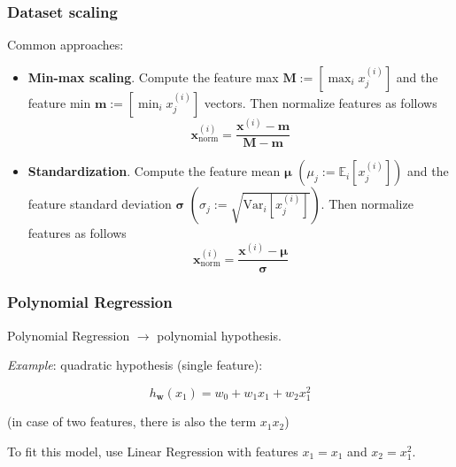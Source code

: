 \documentclass{beamer}
\begin{document}
	\begin{frame}
		\frametitle{Dataset scaling}
	
		Common approaches:
		\begin{itemize}
			\item \textbf{Min-max scaling}. Compute the feature max $\bm{M} := [\max_i x^{(i)}_j]$ and the feature min $\bm{m} := [\min_i x^{(i)}_j]$ vectors. Then normalize features as follows
			\begin{equation*}
				\bm{x}_{\text{norm}}^{(i)} = \frac{\bm{x}^{(i)} - \bm{m}}{\bm{M} - \bm{m}}
			\end{equation*} 
			\item \textbf{Standardization}. Compute the feature mean $\bm{\mu}$ $(\mu_j := \mathbb{E}_i[x^{(i)}_j])$ and the feature standard deviation $\bm{\sigma}$ $(\sigma_j := \sqrt{\text{Var}_i[x^{(i)}_j]})$. Then normalize features as follows
			\begin{equation*}
				\bm{x}_{\text{norm}}^{(i)} = \frac{\bm{x}^{(i)} -\bm{\mu}}{\bm{\sigma}} 
			\end{equation*}
		\end{itemize}
		
	\end{frame}



	\begin{frame}
		\frametitle{Polynomial Regression}
		Polynomial Regression $\rightarrow$ polynomial hypothesis.
		
		\vspace{5mm}
		
		\textit{Example}: quadratic hypothesis (single feature):	
		
		$$h_{\bm{w}}(x_1) = w_0 + w_1 x_1 + w_2 x_1^2$$
		
		(in case of two features, there is also the term $x_1 x_2$)
		
		\vspace{5mm}
		
		To fit this model, use Linear Regression with features $x_1 = x_1$ and $x_2 = x_1^2$.
	\end{frame}
\end{document}
